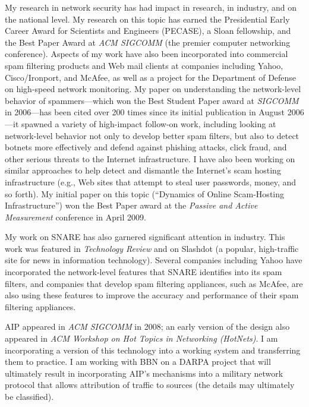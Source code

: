 My research in network security has had impact in research, in industry,
and on the national level.  My research on this topic has earned the
Presidential Early Career Award for Scientists and Engineers (PECASE), a
Sloan fellowship, and the Best Paper Award at {\em ACM SIGCOMM} (the
premier computer networking conference).  Aspects of my work have also
been incorporated into commercial spam filtering products and Web mail
clients at companies including Yahoo, Cisco/Ironport, and McAfee, as
well as a project for the Department of Defense on high-speed network
monitoring.  My paper on understanding the network-level behavior of
spammers---which won the Best Student Paper award at {\em SIGCOMM} in
2006---has been cited over 200 times since its initial publication in
August 2006---it spawned a variety of high-impact follow-on work,
including looking at network-level behavior not only to develop better
spam filters, but also to detect botnets more effectively and defend
against phishing attacks, click fraud, and other serious threats to the
Internet infrastructure.  I have also been working on similar approaches
to help detect and dismantle the Internet's scam hosting infrastructure
(e.g., Web sites that attempt to steal user passwords, money, and so
forth).  My initial paper on this topic (``Dynamics of Online
Scam-Hosting Infrastructure'') won the Best Paper award at the {\em
Passive and Active Measurement} conference in April 2009.

My work on SNARE has also garnered significant attention in industry.
This work was featured in {\em Technology Review} and on Slashdot (a
popular, high-traffic site for news in information technology).  Several
companies including Yahoo have incorporated the network-level features
that SNARE identifies into its spam filters, and companies that develop
spam filtering appliances, such as McAfee, are also using these features
to improve the accuracy and performance of their spam filtering
appliances.

AIP appeared in {\em ACM SIGCOMM} in 2008; an early version of the
design also appeared in {\em ACM Workshop on Hot Topics in Networking
(HotNets)}.  I am incorporating a version of this technology into a
working system and transferring them to practice.  I am working with BBN
on a DARPA project that will ultimately result in incorporating AIP's
mechanisms into a military network protocol that allows attribution of
traffic to sources (the details may ultimately be classified). 

